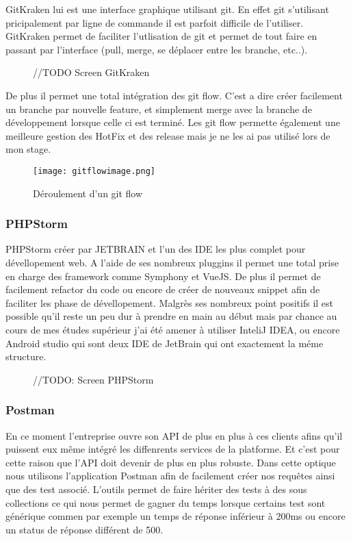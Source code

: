 GitKraken lui est une interface graphique utilisant git. En effet git s'utilisant pricipalement par ligne de commande il est parfoit difficile de l'utiliser. GitKraken permet de faciliter l'utlisation de git et permet de tout faire en passant par l'interface (pull, merge, se déplacer entre les branche, etc..).

\begin{figure}[htbp]
    \center
    //TODO Screen GitKraken
\end{figure}

De plus il permet une total intégration des git flow. C'est a dire créer facilement un branche par nouvelle feature, et simplement merge avec la branche de développement lorsque celle ci est terminé.
Les git flow permette également une meilleure gestion des HotFix et des release mais je ne les ai pas utilisé lors de mon stage. 

\begin{figure}[htbp]
    \center
\texttt{[image: gitflowimage.png]}
\caption{Déroulement d'un git flow}
\end{figure}


\subsubsection{PHPStorm}

PHPStorm créer par JETBRAIN et l'un des IDE les plus complet pour dévellopement web.
A l'aide de ses nombreux pluggins il permet une total prise en charge des framework comme Symphony et VueJS. De plus il permet de facilement refactor du code  ou encore de créer de nouveaux snippet afin de faciliter les phase de dévellopement.
Malgrès ses nombreux point positifs il est possible qu'il reste un peu dur à prendre en main au début mais par chance au cours de mes études supérieur j'ai été amener à utiliser InteliJ IDEA, ou encore Android studio qui sont deux IDE de JetBrain qui ont exactement la méme structure. 

\begin{figure}[htbp]
    \center 
    //TODO: Screen PHPStorm
\end{figure}


\subsubsection{Postman}

En ce moment l'entreprise ouvre son API de plus en plus à ces clients afins qu'il puissent eux même intégré les diffenrents services de la platforme. Et c'est pour cette raison que l'API doit devenir de plus en plus robuste. Dans cette optique nous utilisons l'application Postman afin de facilement créer nos requêtes ainsi que des test associé. L'outils permet de faire hériter des tests à des sous collections ce qui nous permet de gagner du temps lorsque certains test sont générique commen par exemple un temps de réponse inférieur à 200ms ou encore un status de réponse différent de 500. 

